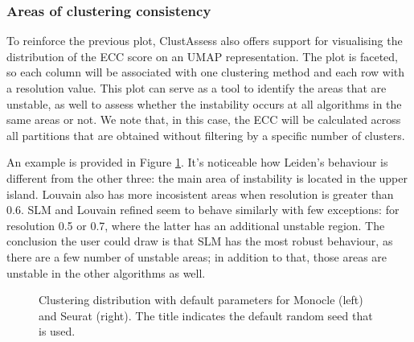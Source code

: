 \subsubsection{Areas of clustering consistency}
To reinforce the previous plot, ClustAssess also offers support for visualising the distribution of the ECC score on an UMAP representation. The plot is faceted, so each column will be associated with one clustering method and each row with a resolution value. This plot can serve as a tool to identify the areas that are unstable, as well to assess whether the instability occurs at all algorithms in the same areas or not. We note that, in this case, the ECC will be calculated across all partitions that are obtained without filtering by a specific number of clusters.

An example is provided in Figure \ref{fig:ca-clust-dif-facet}. It's noticeable how Leiden's behaviour is different from the other three: the main area of instability is located in the upper island. Louvain also has more incosistent areas when resolution is greater than 0.6. SLM and Louvain refined seem to behave similarly with few exceptions: for resolution 0.5 or 0.7, where the latter has an additional unstable region. The conclusion the user could draw is that SLM has the most robust behaviour, as there are a few number of unstable areas; in addition to that, those areas are unstable in the other algorithms as well.

\begin{figure}[H]
    \centering
    \caption{\label{fig:ca-clust-dif-facet}Clustering distribution with default parameters for Monocle (left) and Seurat (right). The title indicates the default random seed that is used.}
\end{figure}

